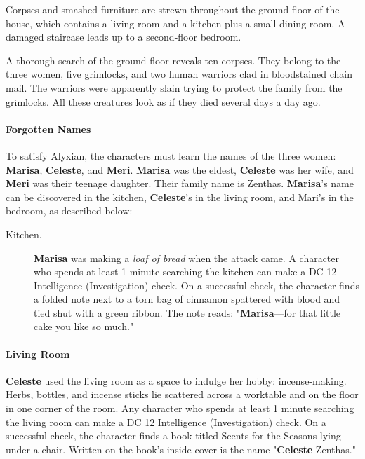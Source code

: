 \documentclass[letterpaper, 11pt, bg=full, twocolumn]{dndbook}
\begin{document}
\begin{DndReadAloud}
Corpses and smashed furniture are strewn throughout the ground floor of the house, which contains a living room and a kitchen plus a small dining room. A damaged staircase leads up to a second-floor bedroom.
\end{DndReadAloud}

A thorough search of the ground floor reveals ten corpses. They belong to the three women, five grimlocks, and two human warriors clad in bloodstained chain mail. The warriors were apparently slain trying to protect the family from the grimlocks. All these creatures look as if they died several days a day ago.

\paragraph{Forgotten Names}

To satisfy Alyxian, the characters must learn the names of the three women: \textbf{Marisa}, \textbf{Celeste}, and \textbf{Meri}. \textbf{Marisa} was the eldest, \textbf{Celeste} was her wife, and \textbf{Meri} was their teenage daughter. Their family name is Zenthas. \textbf{Marisa}'s name can be discovered in the kitchen, \textbf{Celeste}'s in the living room, and Mari's in the bedroom, as described below:

\begin{description}
\item[Kitchen.] \textbf{Marisa} was making a \textit{loaf of bread} when the attack came. A character who spends at least 1 minute searching the kitchen can make a DC 12 Intelligence (Investigation) check. On a successful check, the character finds a folded note next to a torn bag of cinnamon spattered with blood and tied shut with a green ribbon. The note reads: "\textbf{Marisa}---for that little cake you like so much."
\end{description}

\paragraph{Living Room}

\textbf{Celeste} used the living room as a space to indulge her hobby: incense-making. Herbs, bottles, and incense sticks lie scattered across a worktable and on the floor in one corner of the room. Any character who spends at least 1 minute searching the living room can make a DC 12 Intelligence (Investigation) check. On a successful check, the character finds a book titled Scents for the Seasons lying under a chair. Written on the book's inside cover is the name "\textbf{Celeste} Zenthas."
\end{document}

